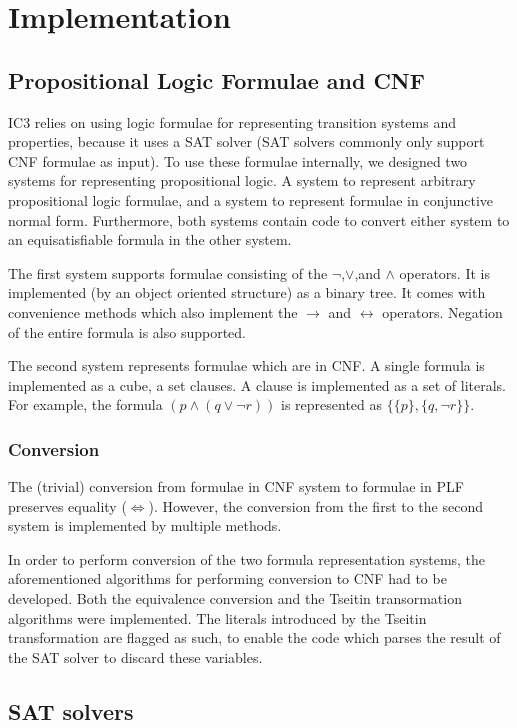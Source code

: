 \documentclass[a4paper]{article}
\begin{document}
\section{Implementation}
\subsection{Propositional Logic Formulae and CNF}
IC3 relies on using logic formulae for representing transition systems and properties, because it uses a SAT solver (SAT solvers commonly only support CNF formulae as input). To use these formulae internally, we designed two systems for representing propositional logic. A system to represent arbitrary propositional logic formulae, and a system to represent formulae in conjunctive normal form. Furthermore, both systems contain code to convert either system to an equisatisfiable formula in the other system.

The first system supports formulae consisting of the $\lnot$,$\lor$,and $\land$ operators. It is implemented (by an object oriented structure) as a binary tree. It comes with convenience methods which also implement the $\rightarrow$ and $\leftrightarrow$ operators. Negation of the entire formula is also supported.

The second system represents formulae which are in CNF. A single formula is implemented as a cube, a set clauses. A clause is implemented as a set of literals. For example, the formula $(p \land (q \lor \lnot r))$ is represented as $\{\{p\},\{q,\lnot r\}\}$.

\subsubsection{Conversion}
The (trivial) conversion from formulae in CNF system to formulae in PLF preserves equality ($\Leftrightarrow$). However, the conversion from the first to the second system is implemented by multiple methods.

In order to perform conversion of the two formula representation systems, the aforementioned algorithms for performing conversion to CNF had to be developed. Both the equivalence conversion and the Tseitin transormation algorithms were implemented.  The literals introduced by the Tseitin transformation are flagged as such, to enable the code which parses the result of the SAT solver to discard these variables.

\subsection{SAT solvers}
\end{document}
